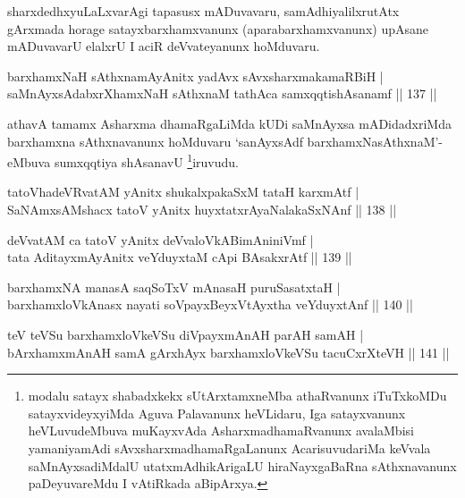 \begin{artha}
sharxdedhxyuLaLxvarAgi tapasusx mADuvavaru, samAdhiyalilxrutAtx
gArxmada horage satayxbarxhamxvanunx (aparabarxhamxvanunx) upAsane
mADuvavarU elalxrU I aciR deVvateyanunx hoMduvaru.
\end{artha}


\begin{shl}
barxhamxNaH sAthxnamAyAnitx yadAvx sAvxsharxmakamaRBiH | \\
saMnAyxsAdabxrXhamxNaH sAthxnaM tathAca samxqqtishAsanamf \hfill|| 137 || 
\end{shl}

\begin{artha}
athavA tamamx Asharxma dhamaRgaLiMda kUDi saMnAyxsa mADidadxriMda
barxhamxna sAthxnavanunx hoMduvaru `sanAyxsAdf barxhamxNasAthxnaM'- eMbuva sumxqqtiya
shAsanavU \footnote{modalu satayx shabadxkekx sUtArxtamxneMba
  athaRvanunx iTuTxkoMDu satayxvideyxyiMda Aguva Palavanunx heVLidaru,
Iga satayxvanunx heVLuvudeMbuva muKayxvAda AsharxmadhamaRvanunx
avalaMbisi yamaniyamAdi sAvxsharxmadhamaRgaLanunx AcarisuvudariMa
keVvala saMnAyxsadiMdalU utatxmAdhikArigaLU hiraNayxgaBaRna
sAthxnavanunx paDeyuvareMdu I vAtiRkada aBipArxya.}iruvudu.
\end{artha}



\begin{shl}
tatoV\s hadeVRvatAM yAnitx shukalxpakaSxM tataH karxmAtf | \\
SaNAmxsAMshacx tatoV yAnitx huyxtatxrAyaNalakaSxNAnf \hfill|| 138 || 
\end{shl}

\begin{shl}
deVvatAM ca tatoV yAnitx deVvaloVkABimAniniVmf | \\
tata AditayxmAyAnitx veYduyxtaM cApi BAsakxrAtf \hfill|| 139 || 
\end{shl}

\begin{shl}
barxhamxNA manasA saqSoTxV mAnasaH puruSasatxtaH | \\
barxhamxloVkAnasx nayati soV\s payxBeyxVtAyxtha veYduyxtAnf \hfill|| 140 || 
\end{shl}

\begin{shl}
teV teVSu barxhamxloVkeVSu diVpayxmAnAH parAH samAH | \\
bArxhamxmAnAH samA gArxhAyx barxhamxloVkeVSu tacuCxrXteVH \hfill|| 141 || 
\end{shl}

